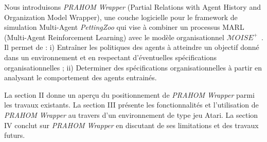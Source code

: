 \documentclass[demonstration]{jfsma}
\begin{document}
Nous introduisons \emph{PRAHOM Wrapper} (Partial Relations with Agent History and Organization Model Wrapper), une couche logicielle pour le framework de simulation Multi-Agent \emph{PettingZoo} qui vise à combiner un processus MARL (Multi-Agent Reinforcement Learning) avec le modèle organisationnel $\mathcal{M}OISE^+$~\cite{Hubner2007}. Il permet de :
%
i) Entraîner les politiques des agents à atteindre un objectif donné dans un environnement et en respectant d'éventuelles spécifications organisationnelles ;\quad
ii) Determiner des spécifications organisationnelles à partir en analysant le comportement des agents entrainés.

La section II donne un aperçu du positionnement de \emph{PRAHOM Wrapper} parmi les travaux existants.
La section III  présente les fonctionnalités et l'utilisation de \emph{PRAHOM Wrapper} au travers d'un environnement de type jeu Atari.
La section IV conclut sur \emph{PRAHOM Wrapper} en discutant de ses limitations et des travaux futurs.






\end{document}
